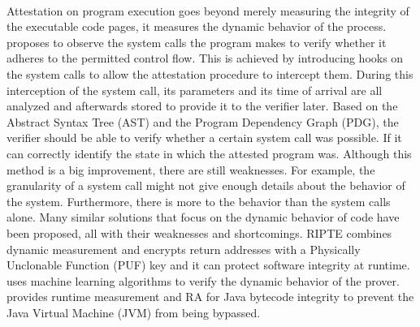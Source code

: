 \paragraph*{}
Attestation on program execution goes beyond merely measuring the integrity of the executable code pages, it measures the dynamic behavior of the process. \cite{GuLiang2008Raop} proposes to observe the system calls the program makes to verify whether it adheres to the permitted control flow. This is achieved by introducing hooks on the system calls to allow the attestation procedure to intercept them. During this interception of the system call, its parameters and its time of arrival are all analyzed and afterwards stored to provide it to the verifier later. Based on the Abstract Syntax Tree (AST) and the Program Dependency Graph (PDG), the verifier should be able to verify whether a certain system call was possible. If it can correctly identify the state in which the attested program was. Although this method is a big improvement, there are still weaknesses. For example, the granularity of a system call might not give enough details about the behavior of the system. Furthermore, there is more to the behavior than the system calls alone. Many similar solutions that focus on the dynamic behavior of code have been proposed, all with their weaknesses and shortcomings. 
RIPTE \cite{QinYu2020RRIP} combines dynamic measurement and encrypts return addresses with a Physically Unclonable Function (PUF) key and it can protect software integrity at runtime. \cite{AliToqeer2017Daio} uses machine learning algorithms to verify the dynamic behavior of the prover. \cite{BaHaihe2017RMAf} provides runtime measurement and RA for Java bytecode integrity to prevent the Java Virtual Machine (JVM) from being bypassed.

